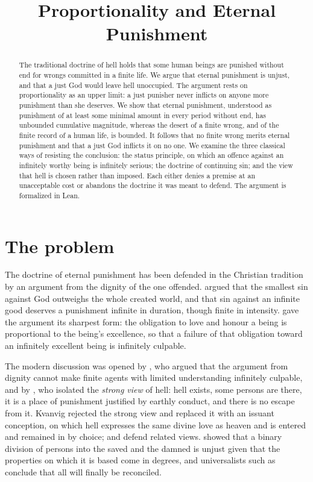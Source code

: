 \documentclass{situationist-preprint}
\title{Proportionality and Eternal Punishment}
\begin{document}
\maketitle

\begin{abstract}
The traditional doctrine of hell holds that some human beings are punished without end for wrongs committed in a finite life. We argue that eternal punishment is unjust, and that a just God would leave hell unoccupied. The argument rests on proportionality as an upper limit: a just punisher never inflicts on anyone more punishment than she deserves. We show that eternal punishment, understood as punishment of at least some minimal amount in every period without end, has unbounded cumulative magnitude, whereas the desert of a finite wrong, and of the finite record of a human life, is bounded. It follows that no finite wrong merits eternal punishment and that a just God inflicts it on no one. We examine the three classical ways of resisting the conclusion: the status principle, on which an offence against an infinitely worthy being is infinitely serious; the doctrine of continuing sin; and the view that hell is chosen rather than imposed. Each either denies a premise at an unacceptable cost or abandons the doctrine it was meant to defend. The argument is formalized in Lean.
\end{abstract}

\section{The problem}

The doctrine of eternal punishment has been defended in the Christian tradition by an argument from the dignity of the one offended. \citet[I.21]{Anselm} argued that the smallest sin against God outweighs the whole created world, and \citet[I--II, q.~87, a.~4]{Aquinas} that sin against an infinite good deserves a punishment infinite in duration, though finite in intensity. \citet{Edwards1738} gave the argument its sharpest form: the obligation to love and honour a being is proportional to the being's excellence, so that a failure of that obligation toward an infinitely excellent being is infinitely culpable.

The modern discussion was opened by \citet{Adams1975}, who argued that the argument from dignity cannot make finite agents with limited understanding infinitely culpable, and by \citet{Kvanvig1993}, who isolated the \emph{strong view} of hell: hell exists, some persons are there, it is a place of punishment justified by earthly conduct, and there is no escape from it. Kvanvig rejected the strong view and replaced it with an issuant conception, on which hell expresses the same divine love as heaven and is entered and remained in by choice; \citet{Walls1992} and \citet{BuckareffPlug2005} defend related views. \citet{Sider2002} showed that a binary division of persons into the saved and the damned is unjust given that the properties on which it is based come in degrees, and universalists such as \citet{Talbott1999} conclude that all will finally be reconciled.
\end{document}
